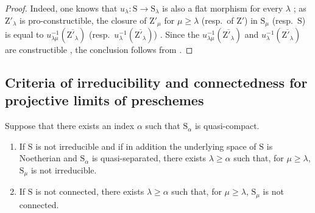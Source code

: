 \begin{proof}
Indeed, one knows that $u_\lambda:\mathrm{S}\to\mathrm{S}_\lambda$ is also a flat morphism for every $\lambda$ ; as $\mathrm{Z}'_\lambda$ is pro-constructible, the closure of $\mathrm{Z}'_\mu$ for $\mu\geqslant\lambda$ (resp.\ of $\mathrm{Z}'$) in $\mathrm{S}_\mu$ (resp.\ $\mathrm{S}$) is equal to $u_{\lambda\mu}^{-1}(\overline{\mathrm{Z}'_\lambda})$ (resp.\ $u_\lambda^{-1}(\overline{\mathrm{Z}'_\lambda})$) .
Since the $u_{\lambda\mu}^{-1}(\overline{\mathrm{Z}'_\lambda})$ and $u_\lambda^{-1}(\overline{\mathrm{Z}'_\lambda})$ are constructible , the conclusion follows from .
\end{proof}

\subsection{Criteria of irreducibility and connectedness for projective limits of preschemes}
\label{subsection:IV.8.4}

\begin{proposition}[8.4.1]
\label{IV.8.4.1}
Suppose that there exists an index $\alpha$ such that $\mathrm{S}_\alpha$ is quasi-compact.
\begin{enumerate}[label=\textup{(\roman*)}]
  \item If $\mathrm{S}$ is not irreducible and if in addition the underlying space of $\mathrm{S}$ is Noetherian and $\mathrm{S}_\alpha$ is quasi-separated, there exists $\lambda\geqslant\alpha$ such that, for $\mu\geqslant\lambda$, $\mathrm{S}_\mu$ is not irreducible.
  \item If $\mathrm{S}$ is not connected, there exists $\lambda\geqslant\alpha$ such that, for $\mu\geqslant\lambda$, $\mathrm{S}_\mu$ is not connected.
\end{enumerate}
\end{proposition}

